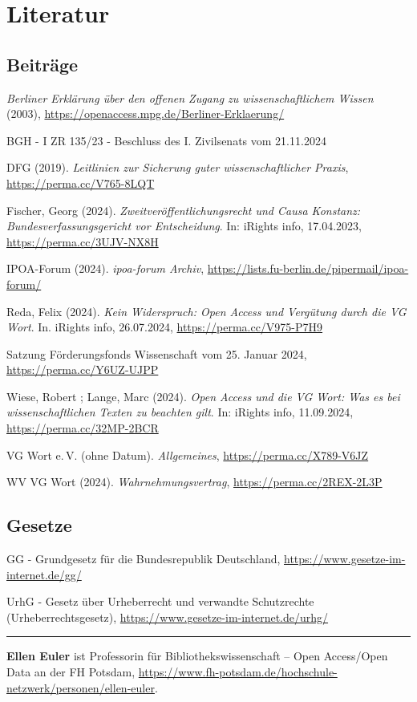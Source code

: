 \documentclass[a4paper,
fontsize=11pt,
oneside,
numbers=noperiodatend,
parskip=half-,
bibliography=totoc,
final
]{scrartcl}
\begin{document}
\section{Literatur}\label{literatur}

\subsection{Beiträge}\label{beitruxe4ge}

\emph{Berliner Erklärung über den offenen Zugang zu wissenschaftlichem
Wissen} (2003), \url{https://openaccess.mpg.de/Berliner-Erklaerung/}

BGH - I ZR 135/23 - Beschluss des I. Zivilsenats vom 21.11.2024

DFG (2019). \emph{Leitlinien zur Sicherung guter wissenschaftlicher
Praxis}, \url{https://perma.cc/V765-8LQT}

Fischer, Georg (2024). \emph{Zweitveröffentlichungsrecht und Causa
Konstanz: Bundesverfassungsgericht vor Entscheidung}. In: iRights info,
17.04.2023, \url{https://perma.cc/3UJV-NX8H}

IPOA-Forum (2024). \emph{ipoa-forum Archiv},
\url{https://lists.fu-berlin.de/pipermail/ipoa-forum/}

Reda, Felix (2024). \emph{Kein Widerspruch: Open Access und Vergütung
durch die VG Wort}. In. iRights info, 26.07.2024,
\url{https://perma.cc/V975-P7H9}

Satzung Förderungsfonds Wissenschaft vom 25. Januar 2024,
\url{https://perma.cc/Y6UZ-UJPP}

Wiese, Robert ; Lange, Marc (2024). \emph{Open Access und die VG Wort:
Was es bei wissenschaftlichen Texten zu beachten gilt}. In: iRights
info, 11.09.2024, \url{https://perma.cc/32MP-2BCR}

VG Wort e.\,V. (ohne Datum). \emph{Allgemeines},
\url{https://perma.cc/X789-V6JZ}

WV VG Wort (2024). \emph{Wahrnehmungsvertrag}, \url{https://perma.cc/2REX-2L3P}

\subsection{Gesetze}\label{gesetze}

GG - Grundgesetz für die Bundesrepublik Deutschland,
\url{https://www.gesetze-im-internet.de/gg/}

UrhG - Gesetz über Urheberrecht und verwandte Schutzrechte
(Urheberrechtsgesetz), \url{https://www.gesetze-im-internet.de/urhg/}

\begin{center}\rule{0.5\linewidth}{0.5pt}\end{center}

\textbf{Ellen Euler} ist Professorin für Bibliothekswissenschaft -- Open
Access/Open Data an der FH Potsdam,
\url{https://www.fh-potsdam.de/hochschule-netzwerk/personen/ellen-euler}.
\end{document}
